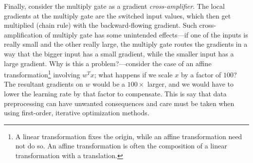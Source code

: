 Finally, consider the multiply gate as a gradient \textit{cross-amplifier}. The local gradients at the multiply gate are the switched input values, which then get multiplied (chain rule) with the backward-flowing gradient. Such cross-amplification of multiply gate has some unintended effects---if one of the inputs is really small and the other really large, the multiply gate routes the gradients in a way that the bigger input has a small gradient, while the smaller input has a large gradient. Why is this a problem?---consider the case of an affine transformation\footnote{A linear transformation fixes the origin, while an affine transformation need not do so. An affine transformation is often the composition of a linear transformation with a translation.} involving $w^Tx$; what happens if we scale $x$ by a factor of $100$? The resultant gradients on $w$ would be a $100\times$ larger, and we would have to lower the learning rate by that factor to compensate. This is say that data preprocessing can have unwanted consequences and care must be taken when using first-order, iterative optimization methods.
